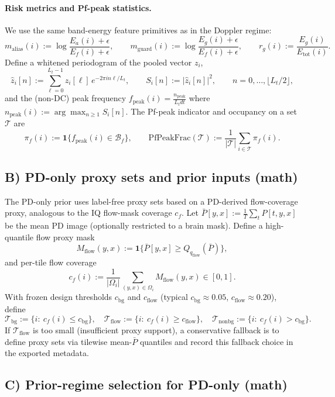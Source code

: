 \documentclass[11pt]{article}
\newcommand{\wh}{\widehat}
\newcommand{\Cf}{\mathcal{B}_f}
\begin{document}
\paragraph{Risk metrics and Pf-peak statistics.}
We use the same band-energy feature primitives as in the Doppler regime:
\[
m_{\mathrm{alias}}(i) := \log\frac{E_a(i)+\epsilon}{E_f(i)+\epsilon},\qquad
m_{\mathrm{guard}}(i) := \log\frac{E_g(i)+\epsilon}{E_f(i)+\epsilon},\qquad
r_g(i) := \frac{E_g(i)}{E_{\mathrm{tot}}(i)}.
\]
Define a whitened periodogram of the pooled vector $z_i$,
\[
\wh z_i[n] := \sum_{\ell=0}^{L_t-1} z_i[\ell]\,e^{-2\pi i n\ell/L_t},\qquad
S_i[n] := |\wh z_i[n]|^2,\qquad n=0,\dots,\lfloor L_t/2\rfloor,
\]
and the (non-DC) peak frequency $f_{\mathrm{peak}}(i)=\frac{n_{\mathrm{peak}}}{L_t dt}$ where
$n_{\mathrm{peak}}(i):=\arg\max_{n\ge 1} S_i[n]$. The Pf-peak indicator and occupancy on a set $\mathcal{T}$ are
\[
\pi_f(i) := \mathbf{1}\{f_{\mathrm{peak}}(i)\in\Cf\},\qquad
\mathrm{PfPeakFrac}(\mathcal{T}) := \frac{1}{|\mathcal{T}|}\sum_{i\in\mathcal{T}}\pi_f(i).
\]

\subsection*{B) PD-only proxy sets and prior inputs (math)}
The PD-only prior uses label-free proxy sets based on a PD-derived flow-coverage proxy, analogous to the IQ flow-mask coverage $c_f$.
Let $\bar P[y,x] := \frac{1}{T}\sum_t P[t,y,x]$ be the mean PD image (optionally restricted to a brain mask). Define a high-quantile flow proxy mask
\[
M_{\mathrm{flow}}(y,x) := \mathbf{1}\{\bar P[y,x]\ge Q_{q_{\mathrm{flow}}}(\bar P)\},
\]
and per-tile flow coverage
\[
c_f(i) := \frac{1}{|\Omega_i|}\sum_{(y,x)\in\Omega_i} M_{\mathrm{flow}}(y,x)\in[0,1].
\]
With frozen design thresholds $c_{\mathrm{bg}}$ and $c_{\mathrm{flow}}$ (typical $c_{\mathrm{bg}}\approx 0.05$, $c_{\mathrm{flow}}\approx 0.20$), define
\[
\mathcal{T}_{\mathrm{bg}} := \{i:\ c_f(i)\le c_{\mathrm{bg}}\},\quad
\mathcal{T}_{\mathrm{flow}} := \{i:\ c_f(i)\ge c_{\mathrm{flow}}\},\quad
\mathcal{T}_{\mathrm{nonbg}} := \{i:\ c_f(i)>c_{\mathrm{bg}}\}.
\]
If $\mathcal{T}_{\mathrm{flow}}$ is too small (insufficient proxy support), a conservative fallback is to define proxy sets via tilewise mean-$\bar P$ quantiles and record this fallback choice in the exported metadata.

\subsection*{C) Prior-regime selection for PD-only (math)}
\end{document}
